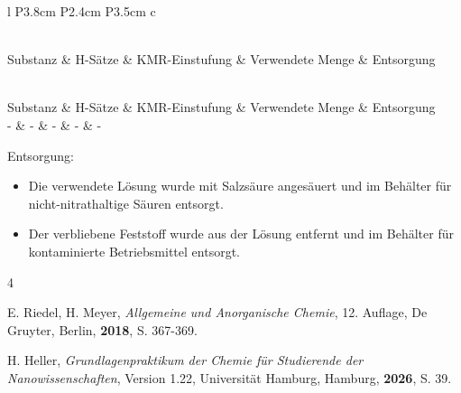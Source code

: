 \documentclass[
	a4paper,										%
	12pt,											%
	twoside,										%
	headsepline,								%
	footsepline,									%
	captions=tableheading,					%
]{scrartcl}
\newcommand{\langetabelle}[6]{  %
	\begin{centering}           %
		{\begin{longtable}[#3]{#4}
				\caption{#2\label{tab: #1}}\\				
				\hline
				#5
				\hline
				\endfirsthead
                \caption{#2\label{tab: #1}}\\
				\hline
				#5
				\hline
				\endhead
				#6												
				\hline 
		\end{longtable}}
\end{centering}}
\begin{document}
\langetabelle
	{KMR_leer3}
	{Verwendete kanzerogene, mutagene oder reproduktionstoxische Gefahrstoffe (KMR).}
	{H}
	{l P{3.8cm} P{2.4cm} P{3.5cm} c}
	{Substanz & H-Sätze & KMR-Einstufung & Verwendete Menge & Entsorgung \\}
	{ - & - & - & - & - \\}
	
Entsorgung: \\
\begin{itemize}
    \item[(1)] Die verwendete Lösung wurde mit Salzsäure angesäuert und im Behälter für nicht-nitrathaltige Säuren entsorgt.
    \item[(2)] Der verbliebene Feststoff wurde aus der Lösung entfernt und im Behälter für kontaminierte Betriebsmittel entsorgt. 
\end{itemize}	


\begin{thebibliography}{4}		%

						{E. Riedel, H. Meyer}, 
			\textit	{Allgemeine und Anorganische Chemie}, 
						{12. Auflage}, 
						{De Gruyter}, 
						{Berlin}, 
			\textbf	{2018}, 
			S.			{367-369}.

						{H. Heller}, 
			\textit	{Grundlagenpraktikum der Chemie für Studierende der Nanowissenschaften}, 
						{Version 1.22}, 
						{Universität Hamburg}, 
						{Hamburg}, 
			\textbf	{2026}, 
			S.			{39}.

\end{thebibliography}
\end{document}
